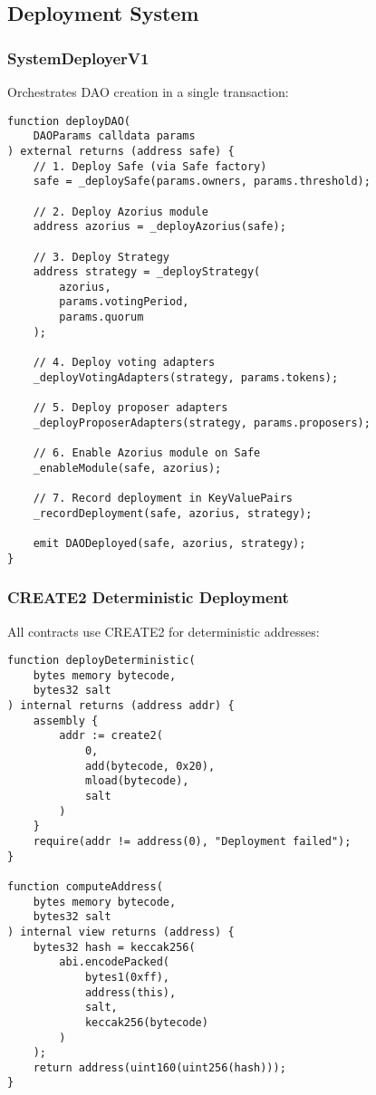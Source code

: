 \documentclass[11pt,a4paper]{article}
\begin{document}
\subsection{Deployment System}

\subsubsection{SystemDeployerV1}

Orchestrates DAO creation in a single transaction:

\begin{lstlisting}[caption=System Deployment]
function deployDAO(
    DAOParams calldata params
) external returns (address safe) {
    // 1. Deploy Safe (via Safe factory)
    safe = _deploySafe(params.owners, params.threshold);

    // 2. Deploy Azorius module
    address azorius = _deployAzorius(safe);

    // 3. Deploy Strategy
    address strategy = _deployStrategy(
        azorius,
        params.votingPeriod,
        params.quorum
    );

    // 4. Deploy voting adapters
    _deployVotingAdapters(strategy, params.tokens);

    // 5. Deploy proposer adapters
    _deployProposerAdapters(strategy, params.proposers);

    // 6. Enable Azorius module on Safe
    _enableModule(safe, azorius);

    // 7. Record deployment in KeyValuePairs
    _recordDeployment(safe, azorius, strategy);

    emit DAODeployed(safe, azorius, strategy);
}
\end{lstlisting}

\subsubsection{CREATE2 Deterministic Deployment}

All contracts use CREATE2 for deterministic addresses:

\begin{lstlisting}[caption=Deterministic Deployment]
function deployDeterministic(
    bytes memory bytecode,
    bytes32 salt
) internal returns (address addr) {
    assembly {
        addr := create2(
            0,
            add(bytecode, 0x20),
            mload(bytecode),
            salt
        )
    }
    require(addr != address(0), "Deployment failed");
}

function computeAddress(
    bytes memory bytecode,
    bytes32 salt
) internal view returns (address) {
    bytes32 hash = keccak256(
        abi.encodePacked(
            bytes1(0xff),
            address(this),
            salt,
            keccak256(bytecode)
        )
    );
    return address(uint160(uint256(hash)));
}
\end{lstlisting}
\end{document}
